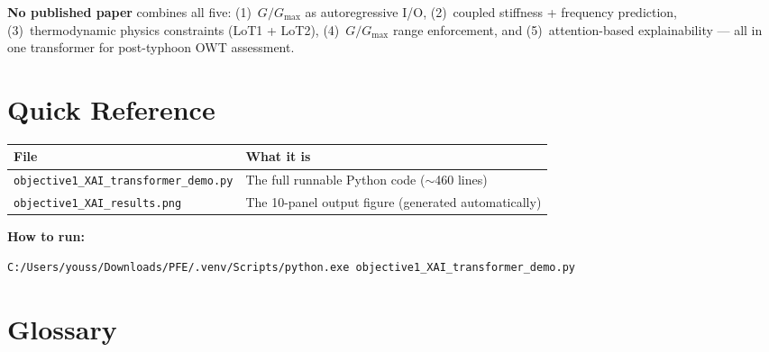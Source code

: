 \documentclass[11pt,a4paper]{article}
\begin{document}
\begin{physbox}
\textbf{No published paper} combines all five: (1)~$G/G_{\max}$ as
autoregressive I/O, (2)~coupled stiffness + frequency prediction,
(3)~thermodynamic physics constraints (LoT1 + LoT2), (4)~$G/G_{\max}$
range enforcement, and (5)~attention-based explainability --- all in
one transformer for post-typhoon OWT assessment.
\end{physbox}


\section{Quick Reference}

\begin{center}
\begin{tabular}{lp{8cm}}
\toprule
\textbf{File} & \textbf{What it is} \\
\midrule
\texttt{objective1\_XAI\_transformer\_demo.py} & The full runnable
  Python code ($\sim$460 lines) \\
\texttt{objective1\_XAI\_results.png} & The 10-panel output figure
  (generated automatically) \\
\bottomrule
\end{tabular}
\end{center}

\textbf{How to run:}
\begin{lstlisting}[language=bash]
C:/Users/youss/Downloads/PFE/.venv/Scripts/python.exe objective1_XAI_transformer_demo.py
\end{lstlisting}


\section{Glossary}
\end{document}
